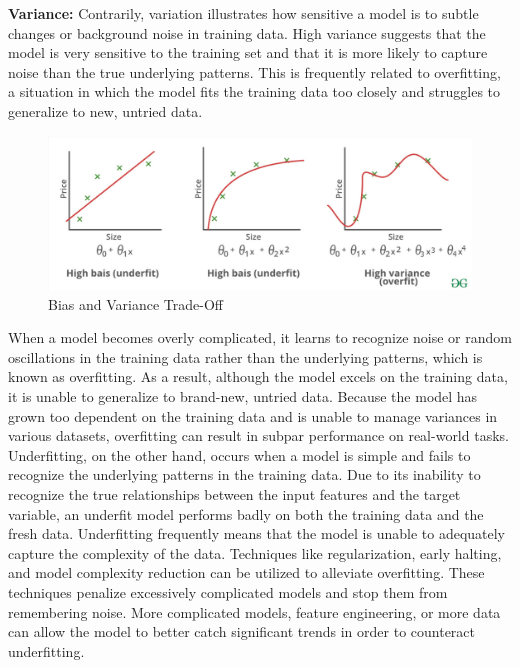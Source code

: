 \documentclass[a4paper,12pt]{report}%
\renewcommand{\\}{\vspace*{0.5\baselineskip} \newline}
\begin{document}
\bigskip
\noindent\textbf{Variance:} Contrarily, variation illustrates how sensitive a model is to subtle changes or background noise in training data. High variance suggests that the model is very sensitive to the training set and that it is more likely to capture noise than the true underlying patterns. This is frequently related to overfitting, a situation in which the model fits the training data too closely and struggles to generalize to new, untried data.




\begin{figure}[h]
\centering
	\includegraphics[scale=0.55]{images/ofuf.png}\\
	\begin{footnotesize}
		\caption{Bias and Variance Trade-Off  \cite{43}}
		\label{ofuf}
	\end{footnotesize}
\end{figure}


\bigskip
\noindent When a model becomes overly complicated, it learns to recognize noise or random oscillations in the training data rather than the underlying patterns, which is known as overfitting. As a result, although the model excels on the training data, it is unable to generalize to brand-new, untried data. Because the model has grown too dependent on the training data and is unable to manage variances in various datasets, overfitting can result in subpar performance on real-world tasks.
Underfitting, on the other hand, occurs when a model is simple and fails to recognize the underlying patterns in the training data. Due to its inability to recognize the true relationships between the input features and the target variable, an underfit model performs badly on both the training data and the fresh data. Underfitting frequently means that the model is unable to adequately capture the complexity of the data.
Techniques like regularization, early halting, and model complexity reduction can be utilized to alleviate overfitting. These techniques penalize excessively complicated models and stop them from remembering noise. More complicated models, feature engineering, or more data can allow the model to better catch significant trends in order to counteract underfitting.
\end{document}
